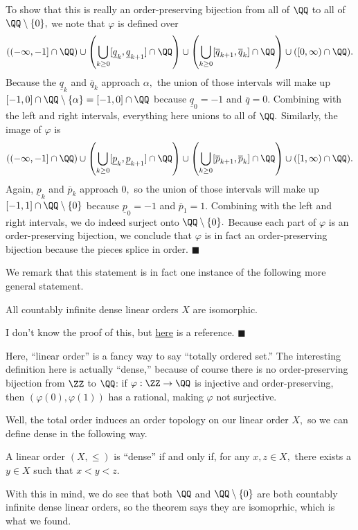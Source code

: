 To show that this is really an order-preserving bijection from all of $\QQ$ to all of $\QQ\setminus\{0\},$ we note that $\varphi$ is defined over
\[((-\infty,-1]\cap\QQ)\cup\left(\bigcup_{k\ge0}[\underline q_k,\underline q_{k+1}]\cap\QQ\right)\cup\left(\bigcup_{k\ge0}[\overline q_{k+1},\overline q_k]\cap\QQ\right)\cup([0,\infty)\cap\QQ).\]
Because the $\underline q_k$ and $\overline q_k$ approach $\alpha,$ the union of those intervals will make up $[-1,0]\cap\QQ\setminus\{\alpha\}=[-1,0]\cap\QQ$ because $\underline q_0=-1$ and $\overline q=0.$ Combining with the left and right intervals, everything here unions to all of $\QQ.$ Similarly, the image of $\varphi$ is
\[((-\infty,-1]\cap\QQ)\cup\left(\bigcup_{k\ge0}[\underline p_k,\underline p_{k+1}]\cap\QQ\right)\cup\left(\bigcup_{k\ge0}[\overline p_{k+1},\overline p_k]\cap\QQ\right)\cup([1,\infty)\cap\QQ).\]
Again, $\underline p_k$ and $\overline p_k$ approach $0,$ so the union of those intervals will make up $[-1,1]\cap\QQ\setminus\{0\}$ because $\underline p_0=-1$ and $\overline p_1=1.$ Combining with the left and right intervals, we do indeed surject onto $\QQ\setminus\{0\}.$ Because each part of $\varphi$ is an order-preserving bijection, we conclude that $\varphi$ is in fact an order-preserving bijection because the pieces splice in order. $\blacksquare$

We remark that this statement is in fact one instance of the following more general statement.
\begin{theorem}
    All countably infinite dense linear orders $X$ are isomorphic.
\end{theorem}
I don't know the proof of this, but \href{https://math.stackexchange.com/questions/2952730/back-n-forth-or-a-direct-isomorphism-between-a-countable-dlo-without-endpoints-a}{here} is a reference. $\blacksquare$

Here, ``linear order'' is a fancy way to say ``totally ordered set.'' The interesting definition here is actually ``dense,'' because of course there is no order-preserving bijection from $\ZZ$ to $\QQ$: if $\varphi:\ZZ\to\QQ$ is injective and order-preserving, then $(\varphi(0),\varphi(1))$ has a rational, making $\varphi$ not surjective.

Well, the total order induces an order topology on our linear order $X,$ so we can define dense in the following way.
\begin{definition}
    A linear order $(X,\le)$ is ``dense'' if and only if, for any $x,z\in X,$ there exists a $y\in X$ such that $x<y<z.$
\end{definition}
With this in mind, we do see that both $\QQ$ and $\QQ\setminus\{0\}$ are both countably infinite dense linear orders, so the theorem says they are isomoprhic, which is what we found.

